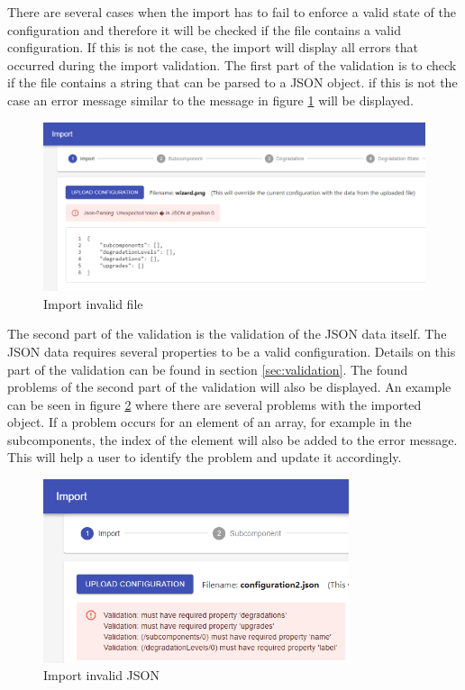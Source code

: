 There are several cases when the import has to fail to enforce a valid state of the configuration and therefore it will be checked if the file contains a valid configuration. If this is not the case, the import will display all errors that occurred during the import validation. The first part of the validation is to check if the file contains a string that can be parsed to a JSON object. if this is not the case an error message similar to the message in figure \ref{fig:import_invalid_file} will be displayed.

\begin{figure}[ht]
    \centering
    \includegraphics[width=\textwidth]{img/import_invalid_file.png}
    \caption{Import invalid file}
    \label{fig:import_invalid_file}
\end{figure}

\noindent The second part of the validation is the validation of the JSON data itself. The JSON data requires several properties to be a valid configuration. Details on this part of the validation can be found in section \ref{sec:validation}.
The found problems of the second part of the validation will also be displayed. An example can be seen in figure \ref{fig:import_invalid_json} where there are several problems with the imported object. If a problem occurs for an element of an array, for example in the subcomponents, the index of the element will also be added to the error message. This will help a user to identify the problem and update it accordingly.

\begin{figure}[ht]
    \centering
    \includegraphics[width=0.8\textwidth]{img/import_invalid_json.png}
    \caption{Import invalid JSON}
    \label{fig:import_invalid_json}
\end{figure}

